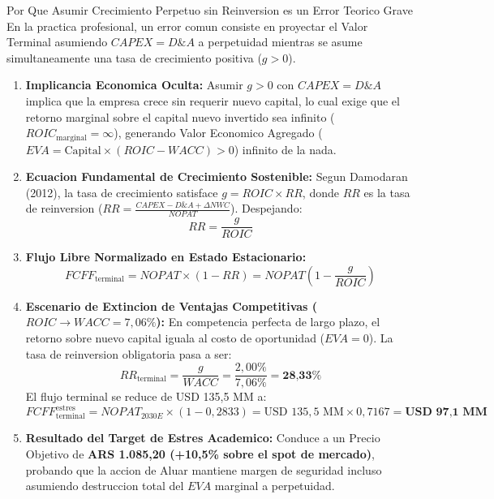 \documentclass[10pt,a4paper]{article}
\theoremstyle{definition}
\begin{document}
\begin{conceptbox}{Por Que Asumir Crecimiento Perpetuo sin Reinversion es un Error Teorico Grave}
En la practica profesional, un error comun consiste en proyectar el Valor Terminal asumiendo $CAPEX = D\&A$ a perpetuidad mientras se asume simultaneamente una tasa de crecimiento positiva ($g > 0$).
\begin{enumerate}
    \item \textbf{Implicancia Economica Oculta:} Asumir $g > 0$ con $CAPEX = D\&A$ implica que la empresa crece sin requerir nuevo capital, lo cual exige que el retorno marginal sobre el capital nuevo invertido sea infinito ($ROIC_{\text{marginal}} = \infty$), generando Valor Economico Agregado ($EVA = \text{Capital} \times (ROIC - WACC) > 0$) infinito de la nada.
    \item \textbf{Ecuacion Fundamental de Crecimiento Sostenible:} Segun Damodaran (2012), la tasa de crecimiento satisface $g = ROIC \times RR$, donde $RR$ es la tasa de reinversion ($RR = \frac{CAPEX - D\&A + \Delta NWC}{NOPAT}$). Despejando:
    \begin{equation}
    RR = \frac{g}{ROIC}
    \end{equation}
    \item \textbf{Flujo Libre Normalizado en Estado Estacionario:}
    \begin{equation}
    FCFF_{\text{terminal}} = NOPAT \times (1 - RR) = NOPAT \left( 1 - \frac{g}{ROIC} \right)
    \end{equation}
    \item \textbf{Escenario de Extincion de Ventajas Competitivas ($ROIC \to WACC = 7,06\%$):}
    En competencia perfecta de largo plazo, el retorno sobre nuevo capital iguala al costo de oportunidad ($EVA = 0$). La tasa de reinversion obligatoria pasa a ser:
    \begin{equation}
    RR_{\text{terminal}} = \frac{g}{WACC} = \frac{2,00\%}{7,06\%} = \textbf{28,33\%}
    \end{equation}
    El flujo terminal se reduce de USD 135,5 MM a:
    \begin{equation}
    FCFF_{\text{terminal}}^{\text{estres}} = NOPAT_{2030E} \times (1 - 0,2833) = \text{USD } 135,5 \text{ MM} \times 0,7167 = \textbf{USD 97,1 MM}
    \end{equation}
    \item \textbf{Resultado del Target de Estres Academico:} Conduce a un Precio Objetivo de \textbf{ARS 1.085,20 (+10,5\% sobre el spot de mercado)}, probando que la accion de Aluar mantiene margen de seguridad incluso asumiendo destruccion total del $EVA$ marginal a perpetuidad.
\end{enumerate}
\end{conceptbox}
\end{document}
